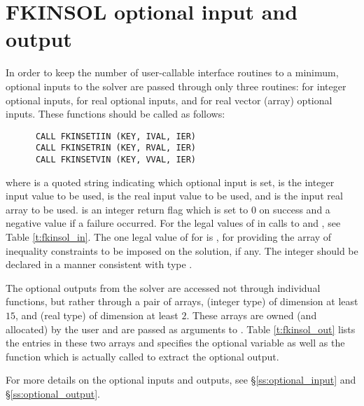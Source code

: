 \section{FKINSOL optional input and output}\label{fkin_opt_inout}

In order to keep the number of user-callable {\fkinsol} interface routines to
a minimum, optional inputs to the {\kinsol} solver are passed through only three
routines:  for integer optional inputs,  for real
optional inputs, and  for real vector (array) optional inputs.
These functions should be called as follows:
\begin{verbatim}
      CALL FKINSETIIN (KEY, IVAL, IER)
      CALL FKINSETRIN (KEY, RVAL, IER)
      CALL FKINSETVIN (KEY, VVAL, IER)
\end{verbatim}
where  is a quoted string indicating which optional input is set,
 is the integer input value to be used,
 is the real input value to be used, and
 is the input real array to be used.
 is an integer return flag which is set to $0$ on success and
a negative value if a failure occurred.
For the legal values of  in calls to  and ,
see Table \ref{t:fkinsol_in}.  The one legal value of  for 
is , for providing the array of inequality constraints to be
imposed on the solution, if any.
The integer  should be declared in a manner consistent with {\CC}
type .

The optional outputs from the {\kinsol} solver are accessed not through
individual functions, but rather through a pair of arrays, 
(integer type) of dimension at least $15$, and  (real type) of
dimension at least $2$.  These arrays are owned (and allocated) by the user
and are passed as arguments to .
Table \ref{t:fkinsol_out} lists the entries in these two arrays and specifies the
optional variable as well as the {\kinsol} function which is actually called to
extract the optional output.

For more details on the optional inputs and outputs, see \S\ref{ss:optional_input}
and \S\ref{ss:optional_output}.

